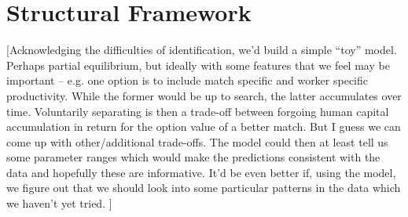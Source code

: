 \documentclass[12pt,a4paper]{article}
\begin{document}
\section{Structural Framework}
[Acknowledging the difficulties of identification, we'd build a simple ``toy'' model. Perhaps partial equilibrium, but ideally with some features that we feel may be important -- e.g. one option is to include match specific and worker specific productivity. While the former would be up to search, the latter accumulates over time. Voluntarily separating is then a trade-off between forgoing human capital accumulation in return for the option value of a better match. But I guess we can come up with other/additional trade-offs. The model could then at least tell us some parameter ranges which would make the predictions consistent with the data and hopefully these are informative. It'd be even better if, using the model, we figure out that we should look into some particular patterns in the data which we haven't yet tried. ]



	
\end{document}
